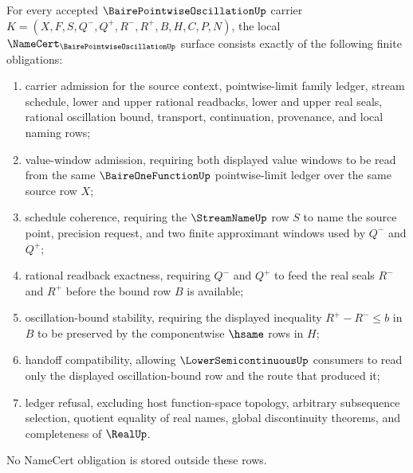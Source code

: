 \begin{theorem}
\label{thm:baire-pointwise-oscillation-namecert-obligations}
For every accepted $\BairePointwiseOscillationUp$ carrier $K=(X,F,S,Q^-,Q^+,R^-,R^+,B,H,C,P,N)$, the local $\NameCert_{\BairePointwiseOscillationUp}$ surface consists exactly of the following finite obligations:
\begin{enumerate}
\item carrier admission for the source context, pointwise-limit family ledger, stream schedule, lower and upper rational readbacks, lower and upper real seals, rational oscillation bound, transport, continuation, provenance, and local naming rows;
\item value-window admission, requiring both displayed value windows to be read from the same $\BaireOneFunctionUp$ pointwise-limit ledger over the same source row $X$;
\item schedule coherence, requiring the $\StreamNameUp$ row $S$ to name the source point, precision request, and two finite approximant windows used by $Q^-$ and $Q^+$;
\item rational readback exactness, requiring $Q^-$ and $Q^+$ to feed the real seals $R^-$ and $R^+$ before the bound row $B$ is available;
\item oscillation-bound stability, requiring the displayed inequality $R^+ - R^- \leq b$ in $B$ to be preserved by the componentwise $\hsame$ rows in $H$;
\item handoff compatibility, allowing $\LowerSemicontinuousUp$ consumers to read only the displayed oscillation-bound row and the route that produced it;
\item ledger refusal, excluding host function-space topology, arbitrary subsequence selection, quotient equality of real names, global discontinuity theorems, and completeness of $\RealUp$.
\end{enumerate}
No NameCert obligation is stored outside these rows.
\end{theorem}
